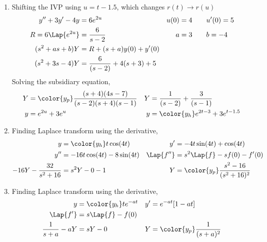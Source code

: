 \begin{enumerate}
    \item Shifting the IVP using $ u = t-1.5 $, which changes $ r(t) \to r(u) $
          \begin{align}
              y'' + 3y' - 4y      & = 6e^{2u}                      &
              u(0)                & = 4 \qquad u'(0) = 5             \\
              R = 6\Lap\{e^{2u}\} & = \frac{6}{s-2}                &
              a                   & = 3 \qquad b = -4                \\
              (s^2 + as + b)Y     & = R + (s+a)y(0) + y'(0)          \\
              (s^2 + 3s - 4)Y     & = \frac{6}{(s-2)} + 4(s+3) + 5
          \end{align}
          Solving the subsidiary equation,
          \begin{align}
              Y                 & = \color{y_p}\frac{(s+4)(4s - 7)}
              {(s-2)(s+4)(s-1)} &
              Y                 & = \frac{1}{(s-2)} + \frac{3}{(s-1)}     \\
              y                 & = e^{2u} + 3e^{u}                     &
              y                 & = \color{y_h} e^{2t-3}  + 3e^{t- 1.5}
          \end{align}

    \item Finding Laplace transform using the derivative,
          \begin{align}
              y                          & = \color{y_h} t\cos(4t)                &
              y'                         & = -4t\sin(4t) + \cos(4t)                 \\
              y''                        & = -16t\cos(4t) - 8\sin(4t)             &
              \Lap\{f''\}                & = s^2\Lap\{f\} - sf(0) - f'(0)           \\
              -16Y - \frac{32}{s^2 + 16} & = s^2Y - 0 - 1                         &
              Y                          & = \color{y_p}\frac{s^2-16}{(s^2+16)^2}
          \end{align}

    \item Finding Laplace transform using the derivative,
          \begin{align}
              y                  & = \color{y_h} te^{-at}         &
              y'                 & = e^{-at}[1 - at]                \\
              \Lap\{f'\}         & = s\Lap\{f\} - f(0)              \\
              \frac{1}{s+a} - aY & = sY - 0                       &
              Y                  & = \color{y_p}\frac{1}{(s+a)^2}
          \end{align}


\end{enumerate}
